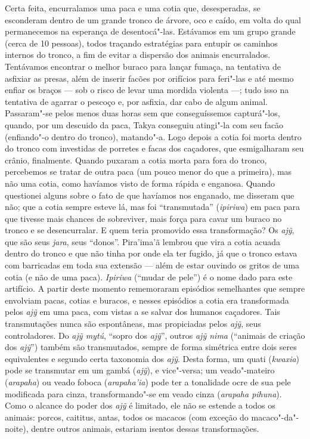 Certa feita, encurralamos uma paca e uma cotia que, desesperadas, se
esconderam dentro de um grande tronco de árvore, oco e caído, em volta
do qual permanecemos na esperança de desentocá"-las. Estávamos em um
grupo grande (cerca de 10 pessoas), todos traçando estratégias para
entupir os caminhos internos do tronco, a fim de evitar a dispersão dos
animais encurralados. Tentávamos encontrar o melhor buraco para lançar
fumaça, na tentativa de asfixiar as presas, além de inserir facões por
orifícios para feri"-las e até mesmo enfiar os braços --- sob o risco de
levar uma mordida violenta ---; tudo isso na tentativa de agarrar o
pescoço e, por asfixia, dar cabo de algum animal. Passaram"-se pelos
menos duas horas sem que conseguíssemos capturá"-los, quando, por um
descuido da paca, Takya conseguiu atingi"-la com seu facão (enfiando"-o
dentro do tronco), matando"-a. Logo depois a cotia foi morta dentro do
tronco com investidas de porretes e facas dos caçadores, que
esmigalharam seu crânio, finalmente. Quando puxaram a cotia morta para
fora do tronco, percebemos se tratar de outra paca (um pouco menor do
que a primeira), mas não uma cotia, como havíamos visto de forma rápida
e enganosa. Quando questionei alguns sobre o fato de que havíamos nos
enganado, me disseram que não; que a cotia sempre esteve lá, mas foi
``transmutada'' (\emph{ipiriwa}) em paca para que tivesse mais chances de
sobreviver, mais força para cavar um buraco no tronco e se
desencurralar. E quem teria promovido essa transformação? Os \emph{ajỹ},
que são seus \emph{jara}, seus ``donos''. Pira'ima'ã lembrou que vira a
cotia acuada dentro do tronco e que não tinha por onde ela ter fugido,
já que o tronco estava com barricadas em toda sua extensão --- além de
estar ouvindo os gritos de uma cotia (e não de uma paca). \emph{Ipiriwa}
(``mudar de pele'') é o nome dado para este artifício. A partir deste
momento rememoraram episódios semelhantes que sempre envolviam pacas,
cotias e buracos, e nesses episódios a cotia era transformada pelos
\emph{ajỹ} em uma paca, com vistas a se salvar dos humanos caçadores.
Tais transmutações nunca são espontâneas, mas propiciadas pelos
\emph{ajỹ}, seus controladores. Do \emph{ajỹ mytú}, ``sopro dos
\emph{ajỹ}'', outros \emph{ajỹ nima} (``animais de criação dos
\emph{ajỹ}'') também são transmutados, sempre de forma simétrica entre
dois seres equivalentes e segundo certa taxonomia dos \emph{ajỹ}. Desta
forma, um quati (\emph{kwaxia}) pode se transmutar em um gambá
(\emph{ajỹ}), e vice"-versa; um veado"-mateiro (\emph{arapaha}) ou veado
foboca (\emph{arapaha'ia}) pode ter a tonalidade ocre de sua pele
modificada para cinza, transformando"-se em veado cinza (\emph{arapaha
pihuna}). Como o alcance do poder dos \emph{ajỹ} é limitado, ele não se
estende a todos os animais: porcos, caititus, antas, todos os macacos
(com exceção do macaco"-da"-noite), dentre outros animais, estariam
isentos dessas transformações.

